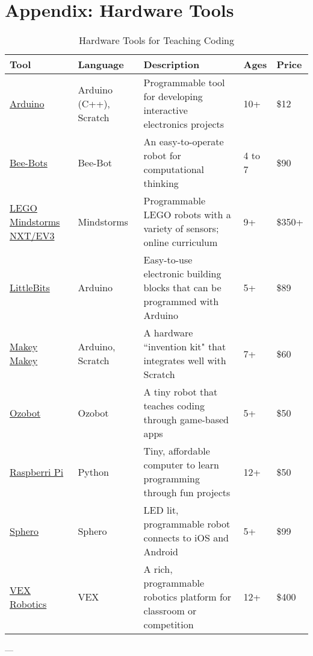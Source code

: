 
\chapter{Appendix: Hardware Tools} %

\label{AppendixHardware} %


\begin{longtable}{p{3.8cm}p{1.8cm}p{4cm}p{1.3cm}p{1.3cm}}
\caption{Hardware Tools for Teaching Coding} \\\hline
\textbf{Tool} & \textbf{Language} & \textbf{Description} & \textbf{Ages} & \textbf{Price} \\ \hline
\href{https://www.arduino.cc/}{Arduino} & Arduino (C++), Scratch & Programmable tool for developing interactive electronics projects & 10+ & \$12\\ \hline
\href{https://www.bee-bot.us/}{Bee-Bots} & Bee-Bot & An easy-to-operate robot for computational thinking & 4 to 7 & \$90\\ \hline
\href{https://education.lego.com/en-us/lesi/middle-school/mindstorms-education-ev3}{LEGO Mindstorms NXT/EV3} & Mindstorms & Programmable LEGO robots with a variety of sensors; online curriculum & 9+ & \$350+\\ \hline
\href{http://littlebits.cc/}{LittleBits} & Arduino & Easy-to-use electronic building blocks that can be programmed with Arduino & 5+ & \$89\\ \hline
\href{http://www.makeymakey.com/}{Makey Makey} & Arduino, Scratch & A hardware ``invention kit" that integrates well with Scratch & 7+ & \$60\\ \hline
\href{http://ozobot.com/}{Ozobot} & Ozobot & A tiny robot that teaches coding through game-based apps & 5+ & \$50\\ \hline
\href{https://www.raspberrypi.org/}{Raspberri Pi} & Python & Tiny, affordable computer to learn programming through fun projects & 12+ & \$50\\ \hline
\href{http://www.sphero.com/}{Sphero} & Sphero & LED lit, programmable robot connects to iOS and Android & 5+ & \$99\\ \hline
\href{http://www.vexrobotics.com/}{VEX Robotics} & VEX & A rich, programmable robotics platform for classroom or competition & 12+ & \$400\\ \hline

\end{longtable}

---


